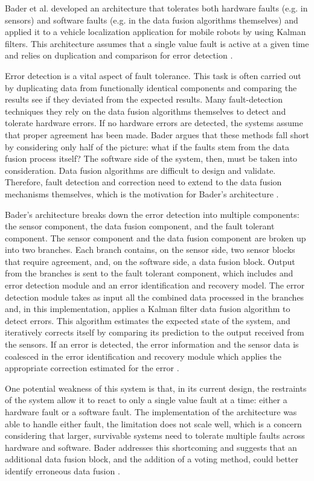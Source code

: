 \documentclass[twoside, conference]{IEEEtran}
\begin{document}
Bader et al. developed an architecture that tolerates both hardware faults (e.g. in sensors) and software faults (e.g. in the data fusion algorithms themselves) and applied it to a vehicle localization application for mobile robots by using Kalman filters. This architecture assumes that a single value fault is active at a given time and relies on duplication and comparison for error detection \cite{Bader2014}.

Error detection is a vital aspect of fault tolerance. This task is often carried out by duplicating data from functionally identical components and comparing the results see if they deviated from the expected results. Many fault-detection techniques they rely on the data fusion algorithms themselves to detect and tolerate hardware errors. If no hardware errors are detected, the systems assume that proper agreement has been made. Bader argues that these methods fall short by considering only half of the picture: what if the faults stem from the data fusion process itself? The software side of the system, then, must be taken into consideration. Data fusion algorithms are difficult to design and validate. Therefore, fault detection and correction need to extend to the data fusion mechanisms themselves, which is the motivation for Bader's architecture \cite{Bader2014}.

Bader's architecture breaks down the error detection into multiple components: the sensor component, the data fusion component, and the fault tolerant component. The sensor component and the data fusion component are broken up into two branches. Each branch contains, on the sensor side, two sensor blocks that require agreement, and, on the software side, a data fusion block. Output from the branches is sent to the fault tolerant component, which includes and error detection module and an error identification and recovery model. The error detection module takes as input all the combined data processed in the branches and, in this implementation, applies a Kalman filter data fusion algorithm to detect errors. This algorithm estimates the expected state of the system, and iteratively corrects itself by comparing its prediction to the output received from the sensors. If an error is detected, the error information and the sensor data is coalesced in the error identification and recovery module which applies the appropriate correction estimated for the error \cite{Bader2014}.

One potential weakness of this system is that, in its current design, the restraints of the system allow it to react to only a single value fault at a time: either a hardware fault or a software fault. The implementation of the architecture was able to handle either fault, the limitation does not scale well, which is a concern considering that larger, survivable systems need to tolerate multiple faults across hardware and software. Bader addresses this shortcoming and suggests that an additional data fusion block, and the addition of a voting method, could better identify erroneous data fusion \cite{Bader2014}.
\end{document}
